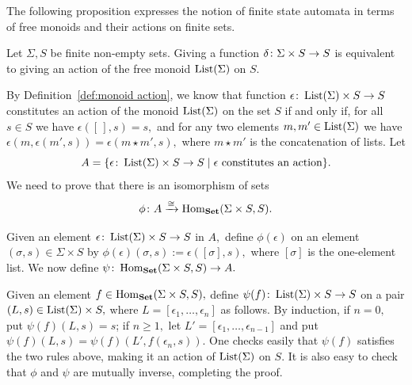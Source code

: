 \documentclass[CT4S-EN-RU]{subfiles}
\begin{document}
\begin{blockENG}
The following proposition expresses the notion of finite state automata in terms of free monoids and their actions on finite sets.
\end{blockENG}

\begin{blockRUS}
\end{blockRUS}

\begin{propositionENG}
Let $\Sigma, S$ be finite non-empty sets. Giving a function $\delta\colon\Sigma\times S\rightarrow S$ is equivalent to giving an action of the free monoid $\operatorname{List}(\Sigma)$ on $S.$
\end{propositionENG}

\begin{propositionRUS}
\end{propositionRUS}

\begin{proofENG}
By Definition~\ref{def:monoid action}, we know that function $\epsilon\colon\operatorname{List}(\Sigma)\times S\rightarrow S$ constitutes an action of the monoid $\operatorname{List}(\Sigma)$ on the set $S$ if and only if, for all $s\in S$ we have $\epsilon([\,],s)=s,$ and for any two elements $m,m'\in\operatorname{List}(\Sigma)$ we have $\epsilon(m,\epsilon(m',s))=\epsilon(m\star m',s),$ where $m\star m'$ is the concatenation of lists. Let $$A=\{\epsilon\colon \operatorname{List}(\Sigma)\times S\rightarrow S{\;|\;}\epsilon\textnormal{ constitutes an action}\}.$$ We need to prove that there is an isomorphism of sets $$\phi\colon A\xrightarrow{\cong}\operatorname{Hom}_{\mathbf{Set}}(\Sigma\times S,S).$$

Given an element $\epsilon\colon\operatorname{List}(\Sigma)\times S\rightarrow S$ in $A,$ define $\phi(\epsilon)$ on an element $(\sigma,s)\in\Sigma\times S$ by $\phi(\epsilon)(\sigma,s):=\epsilon([\sigma],s),$ where $[\sigma]$ is the one-element list. We now define $\psi\colon\operatorname{Hom}_{\mathbf{Set}}(\Sigma\times S,S)\rightarrow A.$

Given an element $f\in\operatorname{Hom}_{\mathbf{Set}}(\Sigma\times S,S),$ define $\psi(f)\colon\operatorname{List}(\Sigma)\times S\rightarrow S$ on a pair $(L,s)\in\operatorname{List}(\Sigma)\times S,$ where $L=[\epsilon_1,\ldots,\epsilon_n]$ as follows. By induction, if $n=0,$ put $\psi(f)(L,s)=s$; if $n\geq 1,$ let $L'=[\epsilon_1,\ldots,\epsilon_{n-1}]$ and put $\psi(f)(L,s)=\psi(f)(L',f(\epsilon_n,s)).$ One checks easily that $\psi(f)$ satisfies the two rules above, making it an action of $\operatorname{List}(\Sigma)$ on $S.$ It is also easy to check that $\phi$ and $\psi$ are mutually inverse, completing the proof.
\end{proofENG}
\end{document}
